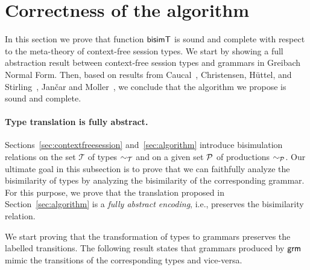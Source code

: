 \section{Correctness of the algorithm}
\label{sec:correctness}

In this section we prove that function $\mathsf{bisimT}$ is sound and complete
with respect to the meta-theory of context-free session types.
%
We start by showing a full abstraction result between context-free
session types and grammars in Greibach Normal Form.
%
Then, based on results from Caucal~\cite{caucal1986decidabilite},
Christensen, H{\"{u}}ttel, and
Stirling~\cite{DBLP:journals/iandc/ChristensenHS95}, Jan{\v{c}}ar and
Moller~\cite{janvcar1999techniques}, we conclude that the algorithm 
we propose is sound and complete.

\paragraph{Type translation is fully abstract.}

Sections~\ref{sec:contextfreesession} and~\ref{sec:algorithm}
introduce bisimulation relations on the set $\mathcal T$ of types
$\sim_\mathcal T$ and on a given set $\mathcal P$ of productions
$\sim_\mathcal P$.  Our ultimate goal in this subsection is to prove that
we can faithfully analyze the bisimilarity of types by analyzing the
bisimilarity of the corresponding grammar. For this purpose, we prove
that the translation proposed in Section~\ref{sec:algorithm} is a
\emph{fully abstract encoding}, i.e., preserves the bisimilarity
relation. %

We start proving that the transformation of types to grammars preserves
the labelled transitions.
%
%
The following result states that grammars produced by
$\mathsf{grm}$ mimic the transitions of the corresponding types
and vice-versa.

